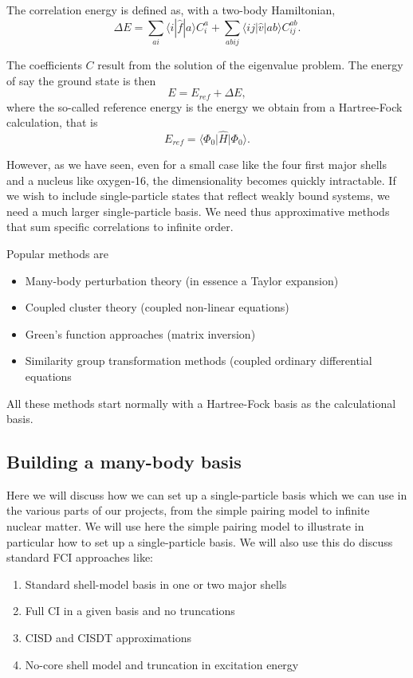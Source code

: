 \noindent
The correlation energy is defined as, with a two-body Hamiltonian,  
\[
\Delta E=\sum_{ai}\langle i| \hat{f}|a \rangle C_{i}^{a}+
\sum_{abij}\langle ij | \hat{v}| ab \rangle C_{ij}^{ab}.
\]

The coefficients $C$ result from the solution of the eigenvalue problem. 
The energy of say the ground state is then
\[
E=E_{ref}+\Delta E,
\]
where the so-called reference energy is the energy we obtain from a Hartree-Fock calculation, that is
\[
E_{ref}=\langle \Phi_0 \vert \hat{H} \vert \Phi_0 \rangle.
\]

However, as we have seen, even for a small case like the four first major shells and a nucleus like oxygen-16, the dimensionality becomes quickly intractable. If we wish to include single-particle states that reflect weakly bound systems, we need a much larger single-particle basis. We need thus approximative methods that sum specific correlations to infinite order. 

Popular methods are
\begin{itemize}
\item Many-body perturbation theory (in essence a Taylor expansion)

\item Coupled cluster theory (coupled non-linear equations)

\item Green's function approaches (matrix inversion)

\item Similarity group transformation methods (coupled ordinary differential equations
\end{itemize}

\noindent
All these methods start normally with a Hartree-Fock basis as the calculational basis. 


\subsection{Building a many-body basis}

Here we will discuss how we can set up a single-particle basis which we can use in the various parts of our projects, from the simple pairing model to infinite nuclear matter. We will use here the simple pairing model to illustrate in particular how to set up a single-particle basis. We will also use this do discuss standard FCI approaches like:
\begin{enumerate}
 \item Standard shell-model basis in one or two major shells

 \item Full CI in a given basis and no truncations

 \item CISD and CISDT approximations

 \item No-core shell model and truncation in excitation energy
\end{enumerate}

